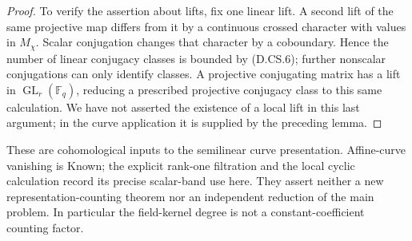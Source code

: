 \begin{proof}
To verify the assertion about lifts, fix one linear
lift. A second lift of the same projective map differs
from it by a continuous crossed character with values
in \(M_\chi\). Scalar conjugation changes that character
by a coboundary. Hence the number of linear conjugacy
classes is bounded by (D.CS.6); further nonscalar
conjugations can only identify classes. A projective
conjugating matrix has a lift in
\(\operatorname{GL}_r(\mathbb F_q)\), reducing a
prescribed projective conjugacy class to this same
calculation. We have not asserted the existence of
a local lift in this last argument; in the curve
application it is supplied by the preceding lemma.
\end{proof}

\begin{remark}
These are cohomological inputs to the semilinear
curve presentation. Affine-curve vanishing is Known;
the explicit rank-one filtration and the local cyclic
calculation record its precise scalar-band use here.
They assert neither a new representation-counting
theorem nor an independent reduction of the main
problem. In particular the field-kernel degree is
not a constant-coefficient counting factor.
\end{remark}
